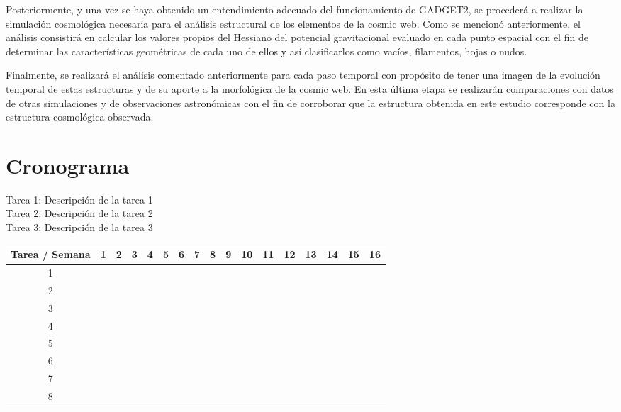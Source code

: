 \documentclass{article}
\begin{document}
Posteriormente, y una vez se haya obtenido un entendimiento adecuado
del funcionamiento de GADGET2, se procederá a realizar la simulación
cosmológica necesaria para el análisis estructural de los elementos de
la cosmic web. Como se mencionó anteriormente, el análisis consistirá
en calcular los valores propios del Hessiano del potencial
gravitacional evaluado en cada punto espacial con el fin de determinar
las características geométricas de cada uno de ellos y así
clasificarlos como vacíos, filamentos, hojas o nudos. 

Finalmente, se realizará el análisis comentado anteriormente para cada
paso temporal con propósito de tener una imagen de la evolución
temporal de estas estructuras y de su aporte a la morfológica de la
cosmic web. En esta última etapa se realizarán comparaciones con datos
de otras simulaciones y de observaciones astronómicas con el fin de
corroborar que la estructura obtenida en este estudio corresponde con
la estructura cosmológica observada.          


\section{Cronograma}

Tarea 1: Descripción de la tarea 1 \\
Tarea 2: Descripción de la tarea 2 \\
Tarea 3: Descripción de la tarea 3 \\

\begin{table}[htb]

\begin{tabular}{|c||c|c|c|c|c|c|c|c|c|c|c|c|c|c|c|c| }

\hline
Tarea / Semana & 1 & 2 & 3 & 4 & 5 & 6 & 7 & 8 & 9 & 10 & 11 & 12 & 13 & 14 & 15 & 16  \\
\hline\hline
1 &   &   &   &   &   &   &   &   &   &   &   &   &   &   &   &  \\
\hline
2 &   &   &   &   &   &   &   &   &   &   &   &   &   &   &   &  \\
\hline
3 &   &   &   &   &   &   &   &   &   &   &   &   &   &   &   &  \\
\hline
4 &   &   &   &   &   &   &   &   &   &   &   &   &   &   &   &  \\
\hline
5 &   &   &   &   &   &   &   &   &   &   &   &   &   &   &   &  \\
\hline
6 &   &   &   &   &   &   &   &   &   &   &   &   &   &   &   &  \\
\hline
7 &   &   &   &   &   &   &   &   &   &   &   &   &   &   &   &  \\
\hline
8 &   &   &   &   &   &   &   &   &   &   &   &   &   &   &   &  \\
\hline

\end{tabular}

\end{table}
\end{document}
